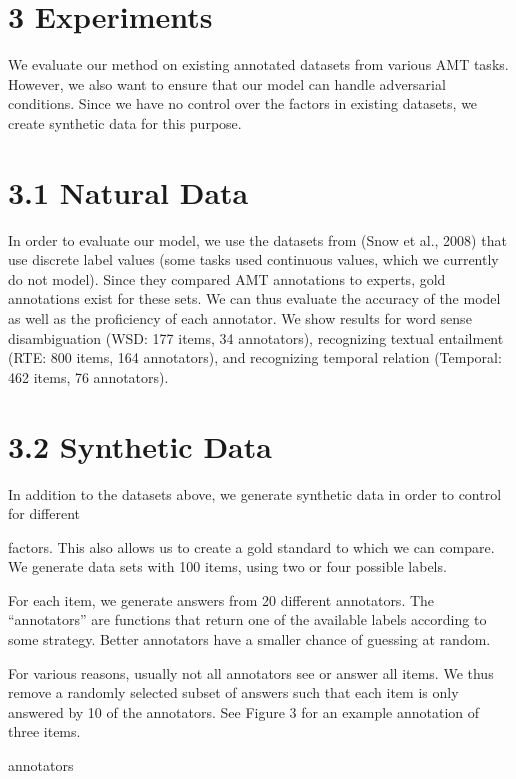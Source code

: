 \documentclass[
]{article}
\begin{document}
\section{3 Experiments}\label{experiments}

We evaluate our method on existing annotated datasets from various AMT
tasks. However, we also want to ensure that our model can handle
adversarial conditions. Since we have no control over the factors in
existing datasets, we create synthetic data for this purpose.

\section{3.1 Natural Data}\label{natural-data}

In order to evaluate our model, we use the datasets from (Snow et al.,
2008) that use discrete label values (some tasks used continuous values,
which we currently do not model). Since they compared AMT annotations to
experts, gold annotations exist for these sets. We can thus evaluate the
accuracy of the model as well as the proficiency of each annotator. We
show results for word sense disambiguation (WSD: 177 items, 34
annotators), recognizing textual entailment (RTE: 800 items, 164
annotators), and recognizing temporal relation (Temporal: 462 items, 76
annotators).

\section{3.2 Synthetic Data}\label{synthetic-data}

In addition to the datasets above, we generate synthetic data in order
to control for different

factors. This also allows us to create a gold standard to which we can
compare. We generate data sets with 100 items, using two or four
possible labels.

For each item, we generate answers from 20 different annotators. The
``annotators'' are functions that return one of the available labels
according to some strategy. Better annotators have a smaller chance of
guessing at random.

For various reasons, usually not all annotators see or answer all items.
We thus remove a randomly selected subset of answers such that each item
is only answered by 10 of the annotators. See Figure 3 for an example
annotation of three items.

annotators
\end{document}

